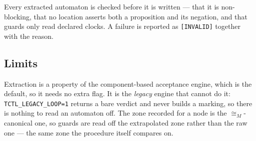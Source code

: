 Every extracted automaton is checked before it is written --- that it is
non-blocking, that no location asserts both a proposition and its negation, and
that guards only read declared clocks.  A failure is reported as
\texttt{[INVALID]} together with the reason.

\subsection{Limits}

Extraction is a property of the component-based acceptance engine, which is the
default, so it needs no extra flag.  It is the \emph{legacy} engine that cannot
do it: \texttt{TCTL\_LEGACY\_LOOP=1} returns a bare verdict and never builds a
marking, so there is nothing to read an automaton off.  The zone recorded for a node is
the $\cong_M$-canonical one, so guards are read off the extrapolated zone rather
than the raw one --- the same zone the procedure itself compares on.
